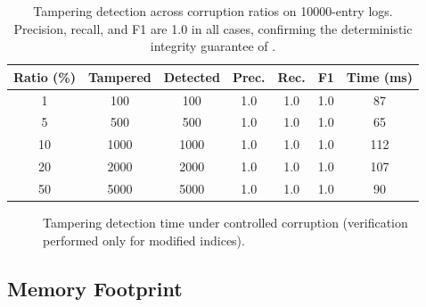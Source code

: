\documentclass[preprint,12pt]{elsarticle}
\begin{document}
\begin{table}[t]
\centering
\caption{Tampering detection across corruption ratios on \num{10000}-entry logs.
Precision, recall, and F1 are 1.0 in all cases, confirming the deterministic integrity guarantee of .}
\label{tab:tampering}
\small
\renewcommand{\arraystretch}{1.2}
\begin{tabular}{S[table-format=2.0]
  S[table-format=4.0]
  S[table-format=4.0]
  S[table-format=1.1]
  S[table-format=1.1]
  S[table-format=1.1]
  S[table-format=3.0]}
\toprule
{\textbf{Ratio (\%)}} &
{\textbf{Tampered}} &
{\textbf{Detected}} &
{\textbf{Prec.}} &
{\textbf{Rec.}} &
{\textbf{F1}} &
{\textbf{Time (ms)}} \\
 &   100 &   100 & 1.0 & 1.0 & 1.0 &  87 \\
  5 &   500 &   500 & 1.0 & 1.0 & 1.0 &  65 \\
 10 &  1000 &  1000 & 1.0 & 1.0 & 1.0 & 112 \\
 20 &  2000 &  2000 & 1.0 & 1.0 & 1.0 & 107 \\
 50 &  5000 &  5000 & 1.0 & 1.0 & 1.0 &  90 \\
\bottomrule
\end{tabular}
\end{table}

\begin{figure}[t]
\centering
{}
\caption{Tampering detection time under controlled corruption (verification performed only for modified indices).}
\label{fig:tampering_time}
\end{figure}

\subsection{Memory Footprint}
\label{sec:memory}
\end{document}
